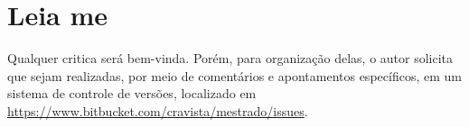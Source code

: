 \chapter*[Introdução]{Leia me}

Qualquer critica será bem-vinda. Porém, para organização delas, o autor solicita que sejam realizadas, por meio de comentários e apontamentos específicos, em um sistema de controle de versões, localizado em \url{https://www.bitbucket.com/cravista/mestrado/issues}. 
